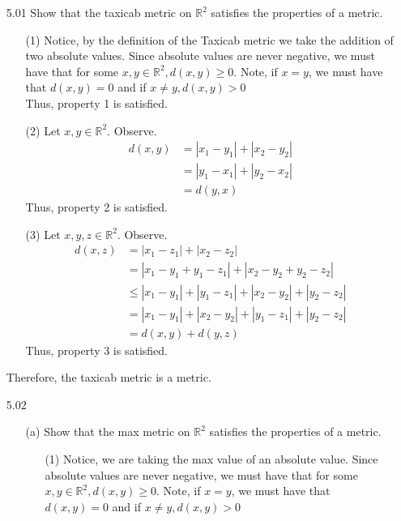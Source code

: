 \documentclass[12pt]{article}
\newcommand{\R}{\mathbb{R}}
\begin{document}
	\pagestyle{fancy}  
	\lfoot{} \cfoot{} \rfoot{}
	
	\begin{enumerate}
		
		\item[5.01] Show that the taxicab metric on $\mathbb { R } ^ { 2 }$ satisfies the properties of a metric.
		\begin{enumerate}
			\item[(1)] Notice, by the definition of the Taxicab metric we take the addition of two absolute values. Since absolute values are never negative, we must have that for some $ x,y\in \R^2 , d(x,y)\geq 0$. Note, if $ x=y $, we must have that $ d(x,y)=0 $ and if $ x\not=y, d(x,y)>0 $\\
			Thus, property 1 is satisfied.
			\item[(2)] Let $ x,y\in \R^2 $. Observe.
			\begin{align*}
			d(x,y) &= |x_1-y_1|+|x_2-y_2|\\
			&= |y_1-x_1|+|y_2-x_2|\\
			&= d(y,x)
			\end{align*}
			Thus, property 2 is satisfied.
			\item[(3)] Let $ x,y,z \in \R^2 $. Observe.
			\begin{align*}
			d(x,z) &= |x_1-z_1|+|x_2-z_2|\\
			&= |x_1-y_1+y_1-z_1|+|x_2-y_2+y_2-z_2|\\
			&\leq |x_1-y_1|+|y_1-z_1|+|x_2-y_2|+|y_2-z_2|\\
			&=    |x_1-y_1|+|x_2-y_2|+|y_1-z_1|+|y_2-z_2|\\
			&= d(x,y)+d(y,z)
			\end{align*}
			Thus, property 3 is satisfied.
		\end{enumerate}
		Therefore, the taxicab metric is a metric.
		\item[5.02] 
		\begin{enumerate}
			\item[(a)] Show that the max metric on $\mathbb { R } ^ { 2 }$ satisfies the properties of a metric.
			\begin{enumerate}
				\item[(1)] Notice, we are taking the max value of an absolute value. Since absolute values are never negative, we must have that for some $ x,y\in \R^2 , d(x,y)\geq 0$. Note, if $ x=y $, we must have that $ d(x,y)=0 $ and if $ x\not=y, d(x,y)>0 $\\ 

\end{enumerate}
\end{enumerate}
\end{enumerate}
\end{document}
